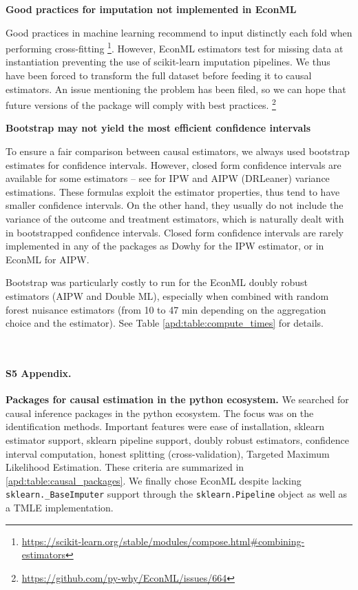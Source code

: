 \documentclass[10pt,letterpaper]{article}
\providecommand{\DIFaddbegin}{} %
\providecommand{\DIFaddend}{} %
\newcommand{\DIFaddincludegraphics}[2][]{{\color{blue}\fbox{\DIFOincludegraphics[#1]{#2}}}} %
\DeclareRobustCommand{\DIFaddbegin}{\DIFOaddbegin \let\includegraphics\DIFaddincludegraphics} %
\DeclareRobustCommand{\DIFaddend}{\DIFOaddend \let\includegraphics\DIFOincludegraphics} %
\begin{document}
\textbf{Good practices for imputation not implemented in EconML}

Good practices in machine learning recommend to input distinctly each fold
when performing cross-fitting
\footnote{\url{https://scikit-learn.org/stable/modules/compose.html\#combining-estimators}}.
However, EconML estimators test for missing data at instantiation
preventing the use of scikit-learn imputation pipelines. We thus have been
forced to transform the full dataset before feeding it to causal estimators.
An issue mentioning the problem has been filed, so we can hope that future
versions of the package will comply with best practices. \footnote{\url{https://github.com/py-why/EconML/issues/664}}

\textbf{Bootstrap may not yield the most efficient confidence intervals}

To ensure a fair comparison between causal estimators, we always used
bootstrap estimates for confidence intervals. However, closed form
confidence intervals are available for some estimators -- see \cite{wager2020stats}
for IPW and AIPW (DRLeaner) variance estimations. These formulas exploit the
estimator properties, thus tend to have smaller confidence intervals. On the
other hand, they usually do not include the variance of the outcome and
treatment estimators, which is naturally dealt with in bootstrapped confidence
intervals. Closed form confidence intervals are rarely implemented in any of the
packages as Dowhy for the IPW estimator, or in EconML for AIPW.

Bootstrap was particularly costly to run for the EconML doubly robust
estimators (AIPW and Double ML), especially when combined with random forest nuisance
estimators (from 10 to 47 min depending on the aggregation choice and the
estimator). See Table \ref{apd:table:compute_times} for details.

\begin{table}[]
  \centering\small
  
  \\
  \caption{Compute times for the different estimation methods with 50 bootstrap replicates.}\label{apd:table:compute_times}
\end{table}
\DIFaddbegin \clearpage
\DIFaddend


\paragraph*{S5 Appendix.}
\label{apd:packages}
{\bf Packages for causal estimation in the python ecosystem.}
We searched for causal inference packages in the python ecosystem. The focus
was on the identification methods. Important features were ease of
installation, sklearn estimator support, sklearn pipeline support, doubly
robust estimators, confidence interval computation, honest splitting
(cross-validation), Targeted Maximum Likelihood Estimation. These criteria are
summarized in \ref{apd:table:causal_packages}. We finally chose EconML despite
lacking \texttt{sklearn.\_BaseImputer} support through the
\texttt{sklearn.Pipeline} object as well as a TMLE implementation.
\end{document}
